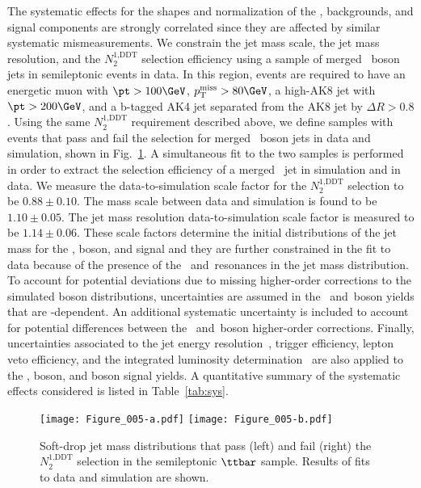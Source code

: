 \documentclass[11pt,twoside,a4paper,cmspaper,final,collab]{cms-tdr}
\begin{document}
The systematic effects for the shapes and normalization of
the \PW, \PZ backgrounds, and signal components are strongly correlated since they are 
affected by similar systematic mismeasurements.  We constrain the jet mass
scale, the jet mass resolution, and the $N_2^\text{1,DDT}$ selection
efficiency using a sample of merged \PW~boson jets in semileptonic
\ttbar events in data.  In this region, events are required to have an energetic 
muon with $\pt > 100\GeV$, $\cmsptmiss > 80\GeV$,
a high-\pt AK8 jet with $\pt > 200\GeV$, and a b-tagged AK4 jet separated from the AK8 jet by
$\Delta R > 0.8$.  Using the same
$N_2^\text{1,DDT}$ requirement described above, we define samples
with events that pass and fail the selection for merged \PW~boson jets in data and
simulation, shown in Fig.~\ref{fig:ttbar}.
A simultaneous fit to the two samples is performed in order to extract
the selection efficiency of a merged \PW~jet in simulation and in data.
We measure the data-to-simulation scale
factor for the $N_2^\text{1,DDT}$ selection to be $ 0.88 \pm 0.10 $.
The mass scale between data and simulation is found to be $ 1.10 \pm 0.05 $. 
The jet mass resolution data-to-simulation scale factor is
measured to be $ 1.14 \pm 0.06 $.  
These scale factors determine the initial distributions of the jet mass
for the \PW, \PZ boson, and signal and they are further constrained in the fit to data 
because of the presence of the \PW~and~\PZ resonances in the jet mass
distribution.  
To account for potential deviations due to missing 
higher-order corrections to the simulated boson \pt distributions, 
uncertainties are assumed in the \PW~and~\PZ boson yields that are \pt-dependent. 
An additional systematic uncertainty 
is included to account for potential differences between the \PW~and~\PZ boson 
higher-order corrections.
Finally, uncertainties associated to the jet energy resolution~\cite{jec}, 
trigger efficiency, lepton veto efficiency, 
and the integrated luminosity determination~\cite{lumi} 
are also applied to
the \PW, \PZ boson, and \PZpr boson signal yields.
A quantitative summary of the systematic effects considered is listed in Table~\ref{tab:sys}.

\begin{figure}[hbtp]
\begin{center}
\texttt{[image: Figure\_005-a.pdf]} \hfil
\texttt{[image: Figure\_005-b.pdf]}
\caption{ Soft-drop jet mass distributions that pass (left) and fail (right) the $N_{2}^\text{1,DDT}$ selection in the semileptonic $\ttbar$ sample. Results of fits to
data and simulation are shown. }
\label{fig:ttbar}
\end{center}
\end{figure}
\end{document}
